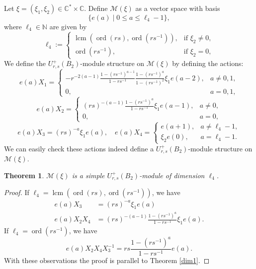 \documentclass[12 pt,reqno]{amsart}
\numberwithin{equation}{section}
\DeclareMathOperator{\ord}{ord}
\newtheorem{thm}{Theorem}[section]
\theoremstyle{definition}
\theoremstyle{definition}
\theoremstyle{remark}
\theoremstyle{remark}
\begin{document}
Let $ \xi = (\xi_1, \xi_2) \in \mathbb{C}^*\times \mathbb{C} $. 
Define $ \mathcal{M}(\xi) $ as a vector space with basis  
$$
    \{ e(a) \mid 0 \leq a \leq \ell_4 - 1\},
$$  
where $ \ell_4\in \mathbb{N} $ are given by  
$$
  \ell_4 := 
    \begin{cases}
        \operatorname{lcm}(\ord(rs),\ord(rs^{-1})), & \text{if } \xi_2\neq 0 , \\[5pt]
        \ord(rs^{-1}), & \text{if } \xi_2=0,
    \end{cases}
$$
We define the $ U_{r,s}^+(B_2) $-module structure on $ \mathcal{M}(\xi) $ by defining the actions:
 $$ e(a)X_1 = 
    \begin{cases}
       \displaystyle -r^{-2(a-1)}\frac{1 - (rs^{-1})^{a-1}}{1 - rs^{-1}}\frac{1 - (rs^{-1})^a}{1 - (rs^{-1})^2}\xi_1e(a-2), & a \neq 0,1, \\[5pt] 
        0, & a = 0,1,
    \end{cases}$$
    $$ e(a)X_2 = 
    \begin{cases}
       \displaystyle (rs)^{-(a-1)}\frac{1 - (rs^{-1})^{a}}{1 - rs^{-1}}\xi_1e(a-1), & a \neq 0, \\[5pt]
        0, & a = 0,
    \end{cases}$$
$$ e(a)X_3 = (rs)^{-a} \xi_1 e(a),\quad e(a)X_4 = 
    \begin{cases}
        e(a+1),  
        &  a \neq  \ell_4 - 1,\\[5pt]
\xi_2e(0),  
        & a = \ell_4 - 1.
    \end{cases} $$ We can easily check these actions indeed define a $U_{r,s}^{+}(B_2)$-module structure on $\mathcal{M}(\xi)$.
   \begin{thm}
    $\mathcal{M}(\xi) $ is a simple $U_{r,s}^{+}(B_2)$-module of dimension $\ell_4$.
   \end{thm}
\begin{proof}
   If $\ell_4= \operatorname{lcm}(\ord(rs),\ord(rs^{-1}))$, we have 
   \begin{align*}
       e(a)X_3&=(rs)^{-a}\xi_1e(a)\\
       e(a)X_2X_4&=(rs)^{-(a-1)}\displaystyle\frac{1-(rs^{-1})^a}{1-rs^{-1}}\xi_1e(a).
   \end{align*}
   If $\ell_4=\ord(rs^{-1})$, we have 
   \[e(a)X_2X_4X_3^{-1}=rs\displaystyle\frac{1-(rs^{-1})^a}{1-rs^{-1}}e(a).\]With these observations the proof is parallel to Theorem \ref{dim1}.
\end{proof}
\end{document}
